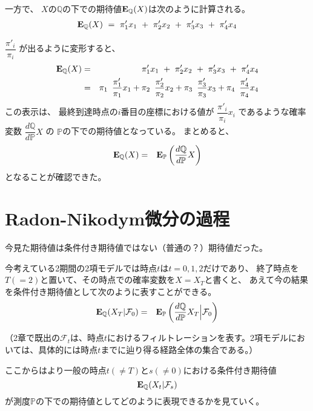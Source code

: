 \documentclass[uplatex,a4j,12pt,dvipdfmx]{jsarticle}
\begin{document}
一方で、
$X$の$\mathbb{Q}$の下での期待値${\bf E}_{\mathbb{Q}}(X)$は次のように計算される。
%
\begin{eqnarray*}
	{\bf E}_{\mathbb{Q}}(X)
	\ = \
	\pi'_{1} x_{1}
	\ + \
	\pi'_{2} x_{2}
	\ + \
	\pi'_{3} x_{3}
	\ + \
	\pi'_{4} x_{4}
\end{eqnarray*}
%

$\dfrac{ \pi'_{i} }{ \pi_{i} }$
が出るように変形すると、
%
\begin{eqnarray*}
	{\bf E}_{\mathbb{Q}}(X)
	&=&
	\pi'_{1} x_{1}
	\ + \
	\pi'_{2} x_{2}
	\ + \
	\pi'_{3} x_{3}
	\ + \
	\pi'_{4} x_{4}
	\\ &=&
	\pi_{1}
	\ \ \!
	\dfrac{ \pi'_{1} }{ \pi_{1} }
	x_{1}
	+
	\pi_{2}
	\ \ \!
	\dfrac{ \pi'_{2} }{ \pi_{2} }
	x_{2}
	+
	\pi_{3}
	\ \ \!
	\dfrac{ \pi'_{3} }{ \pi_{3} }
	x_{3}
	+
	\pi_{4}
	\ \ \!
	\dfrac{ \pi'_{4} }{ \pi_{4} }
	x_{4}
\end{eqnarray*}
%
この表示は、
最終到達時点の$i$番目の座標における値が
$
	\dfrac{ \pi'_{i} }{ \pi_{i} }
	x_{i}
$
であるような確率変数
$
	\dfrac{ d \mathbb{Q} }{ d \mathbb{P} } X
$
の
$\mathbb{P}$の下での期待値となっている。
まとめると、
%
\begin{eqnarray*}
	{\bf E}_{\mathbb{Q}}(X)
	&=&
	{\bf E}_{\mathbb{P}}
	\left(
	\dfrac{ d \mathbb{Q} }{ d \mathbb{P} }
	X
	\right)
\end{eqnarray*}
%
となることが確認できた。
\section{Radon-Nikodym微分の過程}

今見た期待値は条件付き期待値ではない（普通の？）期待値だった。

今考えている2期間の2項モデルでは時点$t$は$t=0,1,2$だけであり、
終了時点を$T(=2)$と置いて、その時点での確率変数を$X=X_{T}$と書くと、
あえて今の結果を条件付き期待値として次のように表すことができる。
%
\begin{eqnarray*}
	{\bf E}_{\mathbb{Q}}(X_{T} | \mathcal{F}_{0} )
	&=&
	{\bf E}_{\mathbb{P}}
	\left(
	\dfrac{ d \mathbb{Q} }{ d \mathbb{P} }
	X_{T} \Big| \mathcal{F}_{0}
	\right)
\end{eqnarray*}
%

（2章で既出の$\mathcal{F}_{t}$は、時点$t$におけるフィルトレーションを表す。2項モデルにおいては、具体的には時点$t$までに辿り得る経路全体の集合である。）

ここからはより一般の時点$t(\neq T)$と$s(\neq 0)$における条件付き期待値
$$
	{\bf E}_{\mathbb{Q}}(X_{t} | \mathcal{F}_{s} )
$$
が測度$\mathbb{P}$の下での期待値としてどのように表現できるかを見ていく。
${}$
\end{document}
